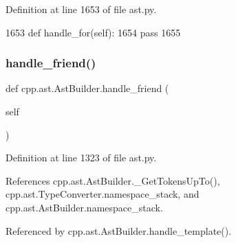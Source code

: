 Definition at line 1653 of file ast.\+py.


\begin{DoxyCode}
1653     \textcolor{keyword}{def }handle\_for(self):
1654         \textcolor{keywordflow}{pass}
1655 
\end{DoxyCode}
\mbox{\label{classcpp_1_1ast_1_1AstBuilder_ab9f7d81019317c6ccfd492bd2c0c9579}} 
\subsubsection{\texorpdfstring{handle\+\_\+friend()}{handle\_friend()}}
{\footnotesize\ttfamily def cpp.\+ast.\+Ast\+Builder.\+handle\+\_\+friend (\begin{DoxyParamCaption}\item[{}]{self }\end{DoxyParamCaption})}



Definition at line 1323 of file ast.\+py.



References cpp.\+ast.\+Ast\+Builder.\+\_\+\+Get\+Tokens\+Up\+To(), cpp.\+ast.\+Type\+Converter.\+namespace\+\_\+stack, and cpp.\+ast.\+Ast\+Builder.\+namespace\+\_\+stack.



Referenced by cpp.\+ast.\+Ast\+Builder.\+handle\+\_\+template().


